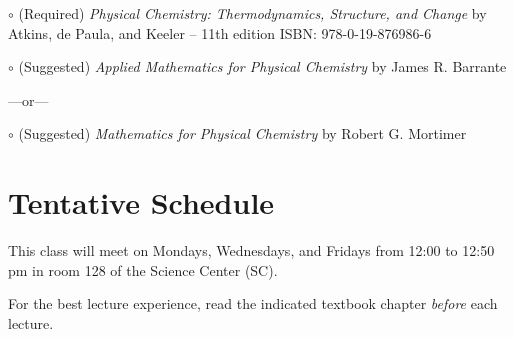 \documentclass[12pt, letterpaper]{article}
\begin{document}
$\circ$ (Required) \emph{Physical Chemistry: Thermodynamics, Structure, and Change} by Atkins, de Paula, and Keeler -- 11th edition ISBN: 978-0-19-876986-6

$\circ$ (Suggested) \emph{Applied Mathematics for Physical Chemistry} by James R. Barrante

\vspace{-4pt}
---or---

\vspace{-4pt}
$\circ$ (Suggested) \emph{Mathematics for Physical Chemistry} by Robert G. Mortimer


\section*{Tentative Schedule}
This class will meet on Mondays, Wednesdays, and Fridays from 12:00 to 12:50 pm in room 128 of the Science Center (SC).

\noindent For the best lecture experience, read the indicated textbook chapter \emph{before} each lecture.
\end{document}
